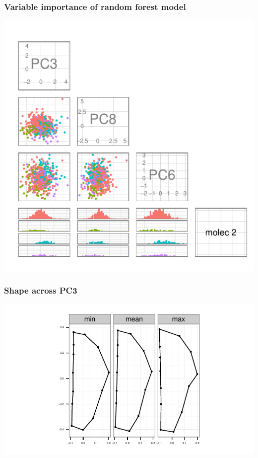 \documentclass{beamer}\usepackage{graphicx, color}
\makeatletter
\def\maxwidth{ %
  \ifdim\Gin@nat@width>\linewidth
    \linewidth
  \else
    \Gin@nat@width
  \fi
}
\newenvironment{knitrout}{}{} %
\makeatother
\begin{document}
\begin{frame}[fragile]
  \frametitle{Variable importance of random forest model}
\begin{knitrout}
\color{fgcolor}
\includegraphics[width=\maxwidth]{figure/imp} 

\end{knitrout}

\end{frame}

\begin{frame}
  \frametitle{Shape across PC3}

\begin{knitrout}
\color{fgcolor}
\includegraphics[width=\maxwidth]{figure/unnamed-chunk-7} 

\end{knitrout}


\end{frame}
\end{document}
